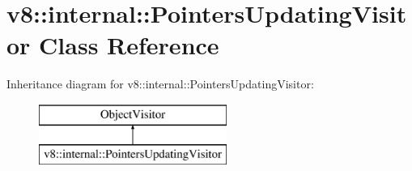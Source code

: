 \hypertarget{classv8_1_1internal_1_1_pointers_updating_visitor}{}\section{v8\+:\+:internal\+:\+:Pointers\+Updating\+Visitor Class Reference}
\label{classv8_1_1internal_1_1_pointers_updating_visitor}
Inheritance diagram for v8\+:\+:internal\+:\+:Pointers\+Updating\+Visitor\+:\begin{figure}[H]
\begin{center}
\leavevmode
\includegraphics[height=2.000000cm]{classv8_1_1internal_1_1_pointers_updating_visitor}
\end{center}
\end{figure}
